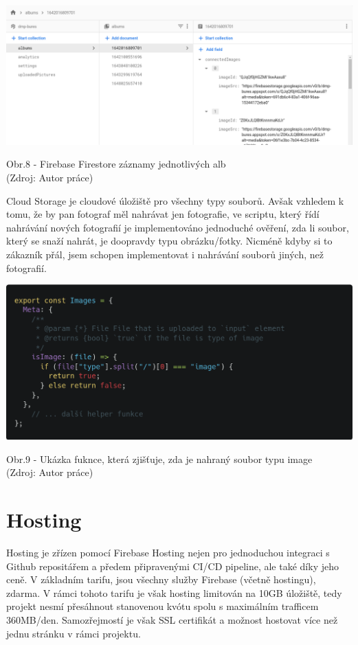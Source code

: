 \documentclass[12pt,a4paper]{report}
\begin{document}
  \vspace*{0.5cm}
  \noindent\includegraphics[width=\linewidth]{firestore.png}
  \begin{center}
    Obr.8 - Firebase Firestore záznamy jednotlivých alb \\
    (Zdroj: Autor práce)
  \end{center}
  \vspace*{0.5cm}

  Cloud Storage je cloudové úložiště pro všechny typy souborů. Avšak vzhledem k tomu, že by pan
  fotograf měl nahrávat jen fotografie, ve scriptu, který řídí nahrávání nových fotografií je
  implementováno jednoduché ověření, zda li soubor, který se snaží nahrát, je doopravdy typu
  obrázku/fotky. Nicméně kdyby si to zákazník přál, jsem schopen implementovat i nahrávání
  souborů jiných, než fotografií.

  \vspace*{0.5cm}
  \noindent\includegraphics[width=\linewidth]{imagesHelperCodeblock.png}
  \begin{center}
    Obr.9 - Ukázka fuknce, která zjišťuje, zda je nahraný soubor typu image \\
    (Zdroj: Autor práce)
  \end{center}
  \vspace*{0.5cm}

  \section{Hosting}
  Hosting je zřízen pomocí Firebase Hosting nejen pro jednoduchou integraci s Github repositářem
  a předem připravenými CI/CD pipeline, ale také díky jeho ceně. V základním tarifu, jsou všechny služby
  Firebase (včetně hostingu), zdarma. V rámci tohoto tarifu je však hosting limitován na 10GB úložiště, tedy projekt 
  nesmí přesáhnout stanovenou kvótu spolu s maximálním trafficem 360MB/den. Samozřejmostí je však SSL certifikát a možnost
  hostovat více než jednu stránku v rámci projektu.
\end{document}
